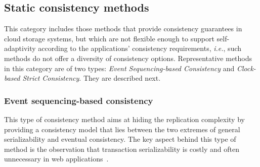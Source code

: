 \subsection{Static consistency methods}

This category includes those methods that provide consistency guarantees in cloud storage systems, but which are not flexible enough to support self-adaptivity according to the applications' consisten\-cy requirements, \textit{i.e.}, such methods do not offer a diversity of consistency options. Representative methods in this category are of two types: \textit{Event Sequencing-based Consistency} and \textit{Clock-bas\-ed Strict Consistency}. They are described next.


\subsubsection{Event sequencing-based consistency}

This type of consistency method aims at hiding the replication complexity by providing a consistency model that lies between the two extremes of general serializability and eventual consistency. The key aspect behind this type of method is the observation that 
transaction serializability is costly and often unnecessary in web applications~\cite{BailisVFHS14}.

